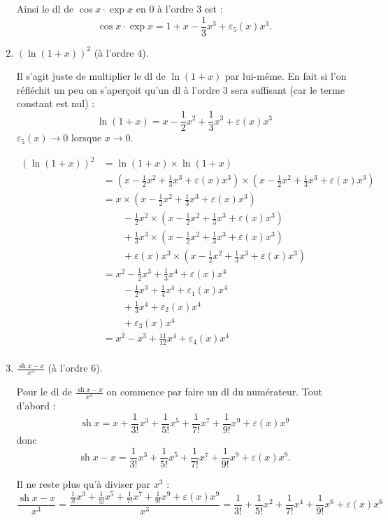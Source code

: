 \documentclass[11pt,a4paper]{article}
\renewcommand{\epsilon}{\varepsilon}
\newcommand{\sh}{\mathop{\mathrm{sh}}\nolimits}
\begin{document}
\begin{enumerate}
Ainsi le dl de $\cos x \cdot \exp x$ en $0$ à l'ordre $3$ est :
$$\cos x \cdot \exp x = 1 + x - \frac13 x^3 + \epsilon_5(x)x^3.$$


\item $\left( \ln (1+x) \right)^2$ (à l'ordre $4$).

Il s'agit juste de multiplier le dl de $\ln(1+x)$ par lui-même.
En fait si l'on réfléchit un peu on s'aperçoit qu'un dl à l'ordre $3$ sera suffisant (car le terme constant est nul) :
$$\ln(1+x)=x-\frac12x^2+\frac13x^3+ \epsilon(x)x^3$$
 $\epsilon_5(x)\to 0$ lorsque $x\to0$.

\begin{align*}
\left( \ln (1+x) \right)^2 
  & = \ln (1+x)  \times \ln (1+x)  \\
  & = \left(x-\frac12x^2+\frac13x^3+ \epsilon(x)x^3\right) \times \left( x-\frac12x^2+\frac13x^3+ \epsilon(x)x^3\right) \\
  & = x \times \left( x-\frac12x^2+\frac13x^3+ \epsilon(x)x^3\right) \\
  & \qquad  -\frac12x^2\times \left( x-\frac12x^2+\frac13x^3+ \epsilon(x)x^3\right) \\
  & \qquad +\frac13x^3\times \left( x-\frac12x^2+\frac13x^3+ \epsilon(x)x^3\right) \\
  & \qquad + \epsilon(x)x^3\times \left( x-\frac12x^2+\frac13x^3+ \epsilon(x)x^3\right) \\
  & =  x^2-\frac12x^3+\frac13x^4+ \epsilon(x)x^4 \\
  & \qquad -\frac12x^3+\frac14x^4+ \epsilon_1(x)x^4 \\
  & \qquad +\frac13x^4 + \epsilon_2(x)x^4 \\
  & \qquad + \epsilon_3(x)x^4 \\  
  & =  x^2-x^3+\frac{11}{12}x^4+ \epsilon_4(x)x^4 \\
\end{align*}


\item $\displaystyle{\frac{\sh x-x}{x^3}}$ (à l'ordre $6$).

Pour le dl de $\displaystyle{\frac{\sh x-x}{x^3}}$ on commence par faire un dl du numérateur.
Tout d'abord :
$$\sh x = x+\frac{1}{3!}x^3+\frac{1}{5!}x^5+\frac{1}{7!}x^7+\frac{1}{9!}x^9 +\epsilon(x) x^9$$
donc 
$$\sh x - x = \frac{1}{3!}x^3+\frac{1}{5!}x^5+\frac{1}{7!}x^7+\frac{1}{9!}x^9 +\epsilon(x) x^9.$$

Il ne reste plus qu'à diviser par $x^3$ :
$$\frac{\sh x-x}{x^3} = \frac{\frac{1}{3!}x^3+\frac{1}{5!}x^5+\frac{1}{7!}x^7+\frac{1}{9!}x^9 +\epsilon(x) x^9 }{x^3} 
= \frac{1}{3!}+\frac{1}{5!}x^2+\frac{1}{7!}x^4+\frac{1}{9!}x^6 +\epsilon(x) x^6$$


\end{enumerate}
\end{document}
